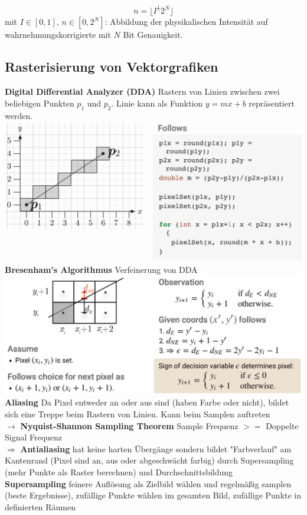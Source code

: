 \documentclass[12pt]{article}
\begin{document}
	$$n = \lfloor I^{\frac{1}{\gamma}} 2^N \rfloor$$
	mit $I \in [0,1]$, $n \in [0,2^N]$: Abbildung der physikalischen Intensität auf wahrnehmungskorrigierte mit $N$ Bit Genauigkeit.

	\subsection{Rasterisierung von Vektorgrafiken}
	\textbf{Digital Differential Analyzer (DDA)} Rastern von Linien zwischen zwei beliebigen Punkten $p_1$ und $p_2$. Linie kann als Funktion $y = mx + b$ repräsentiert werden.\\
	\includegraphics[width=\linewidth]{figures/dda.png}\\
	\textbf{Bresenham's Algorithmus} Verfeinerung von DDA\\
	\includegraphics[width=\linewidth]{figures/bresenham.png}\\
	\textbf{Aliasing} Da Pixel entweder an oder aus sind (haben Farbe oder nicht), bildet sich eine Treppe beim Rastern von Linien. Kann beim Samplen auftreten\\
	$\rightarrow$ \textbf{Nyquist-Shannon Sampling Theorem} Sample Frequenz $>=$ Doppelte Signal Frequenz\\
	$\Rightarrow$ \textbf{Antialiasing} hat keine harten Übergänge sondern bildet "Farbverlauf" am Kantenrand (Pixel sind an, aus oder abgeschwächt farbig) durch Supersampling (mehr Punkte als Raster berechnen) und Durchschnittsbildung\\
	\textbf{Supersampling} feinere Auflösung als Zielbild wählen und regelmäßig samplen (beste Ergebnisse), zufällige Punkte wählen im gesamten Bild, zufällige Punkte in definierten Räumen
\end{document}
